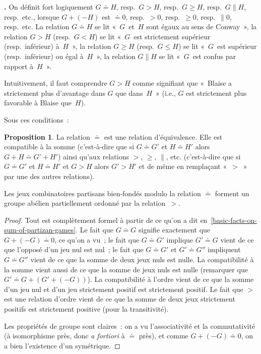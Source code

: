 \documentclass[12pt,a4paper]{article}
\theoremstyle{definition}
\newcommand\thingy{%
\refstepcounter{comcnt}\smallskip\noindent\textbf{\thecomcnt.} }
\newtheorem{prop}[comcnt]{Proposition}
\newcommand{\fuzzy}{\mathrel{\|}}
\begin{document}
\thingy On définit fort logiquement $G \doteq H$, resp. $G > H$,
resp. $G \geq H$, resp. $G\fuzzy H$, resp. etc., lorsque $G + (-H)$
est $\doteq 0$, resp. $>0$, resp. $\geq 0$, resp. $\fuzzy 0$,
resp. etc.  La relation $G \doteq H$ se lit « $G$ et $H$ sont égaux au
  sens de Conway », la relation $G > H$ (resp. $G < H$) se lit
« $G$ est strictement supérieur (resp. inférieur) à $H$ », la relation
$G \geq H$ (resp. $G \leq H$) se lit « $G$ est supérieur
  (resp. inférieur) ou égal à $H$ », la relation $G \fuzzy H$ se lit
« $G$ est confus par rapport à $H$ ».

Intuitivement, il faut comprendre $G>H$ comme signifiant que « Blaise
  a strictement plus d'avantage dans $G$ que dans $H$ » (i.e., $G$ est
strictement plus favorable à Blaise que $H$).

Sous ces conditions :

\begin{prop}\label{conway-equivalence-on-partizan-games}
La relation $\doteq$ est une relation d'équivalence.  Elle est
compatible à la somme (c'est-à-dire que si $G \doteq G'$ et $H \doteq
H'$ alors $G + H \doteq G' + H'$) ainsi qu'aux relations $>$, $\geq$,
$\fuzzy$, etc. (c'est-à-dire que si $G \doteq G'$ et $H \doteq H'$ et
$G > H$ alors $G' > H'$ et de même en remplaçant « $>$ » par une des
autres relations).

Les jeux combinatoires partisans bien-fondés modulo la relation
$\doteq$ forment un groupe abélien partiellement ordonné par la
relation $>$.
\end{prop}
\begin{proof}
Tout est complètement formel à partir de ce qu'on a dit
en \ref{basic-facts-on-sum-of-partizan-games}.  Le fait que $G \doteq
G$ signifie exactement que $G + (-G) \doteq 0$, ce qu'on a vu ; le
fait que $G \doteq G'$ implique $G' \doteq G$ vient de ce que l'opposé
d'un jeu nul est nul ; le fait que $G \doteq G'$ et $G' \doteq G''$
impliquent $G \doteq G''$ vient de ce que la somme de deux jeux nuls
est nulle.  La compatibilité à la somme vient aussi de ce que la somme
de jeux nuls est nulle (remarquer que $G' \doteq G + (G' + (-G))$).
La compatibilité à l'ordre vient de ce que la somme d'un jeu nul et
d'un jeu strictement positif est strictement positif.  Le fait que $>$
est une relation d'ordre vient de ce que la somme de deux jeux
strictement positifs est strictement positive (pour la transitivité).

Les propriétés de groupe sont claires : on a vu l'associativité et la
commutativité (à isomorphisme près, donc \textit{a fortiori} à
$\doteq$ près), et comme $G + (-G) \doteq 0$, on a bien l'existence
d'un symétrique.
\end{proof}
\end{document}
